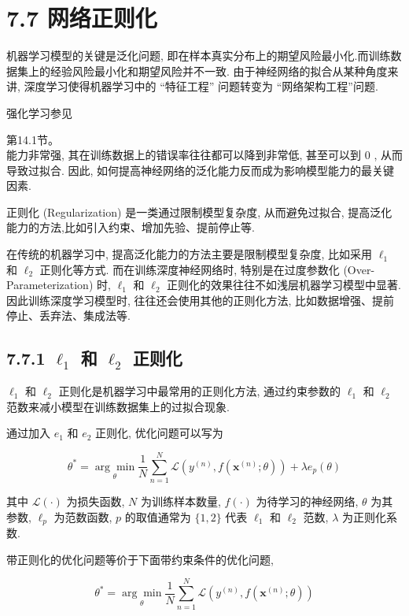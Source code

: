 \documentclass[10pt]{article}
\begin{document}
\section*{7.7 网络正则化}
机器学习模型的关键是泛化问题, 即在样本真实分布上的期望风险最小化.而训练数据集上的经验风险最小化和期望风险并不一致. 由于神经网络的拟合从某种角度来讲, 深度学习使得机器学习中的 “特征工程” 问题转变为 “网络架构工程”问题.

强化学习参见

第14.1节。\\
能力非常强, 其在训练数据上的错误率往往都可以降到非常低, 甚至可以到 0 , 从而导致过拟合. 因此, 如何提高神经网络的泛化能力反而成为影响模型能力的最关键因素.

正则化 (Regularization) 是一类通过限制模型复杂度, 从而避免过拟合, 提高泛化能力的方法,比如引入约束、增加先验、提前停止等.

在传统的机器学习中, 提高泛化能力的方法主要是限制模型复杂度, 比如采用 $\ell_{1}$ 和 $\ell_{2}$ 正则化等方式. 而在训练深度神经网络时, 特别是在过度参数化 (Over-Parameterization) 时, $\ell_{1}$ 和 $\ell_{2}$ 正则化的效果往往不如浅层机器学习模型中显著. 因此训练深度学习模型时, 往往还会使用其他的正则化方法, 比如数据增强、提前停止、丢弃法、集成法等.

\subsection*{7.7.1 $\ell_{1}$ 和 $\ell_{2}$ 正则化}
$\ell_{1}$ 和 $\ell_{2}$ 正则化是机器学习中最常用的正则化方法, 通过约束参数的 $\ell_{1}$ 和 $\ell_{2}$范数来减小模型在训练数据集上的过拟合现象.

通过加入 $e_{1}$ 和 $e_{2}$ 正则化, 优化问题可以写为


\begin{equation*}
\theta^{*}=\underset{\theta}{\arg \min } \frac{1}{N} \sum_{n=1}^{N} \mathcal{L}\left(y^{(n)}, f\left(\boldsymbol{x}^{(n)} ; \theta\right)\right)+\lambda e_{p}(\theta) \tag{7.68}
\end{equation*}


其中 $\mathcal{L}(\cdot)$ 为损失函数, $N$ 为训练样本数量, $f(\cdot)$ 为待学习的神经网络, $\theta$ 为其参数, $\ell_{p}$ 为范数函数, $p$ 的取值通常为 $\{1,2\}$ 代表 $\ell_{1}$ 和 $\ell_{2}$ 范数, $\lambda$ 为正则化系数.

带正则化的优化问题等价于下面带约束条件的优化问题,


\begin{equation*}
\theta^{*}=\underset{\theta}{\arg \min } \frac{1}{N} \sum_{n=1}^{N} \mathcal{L}\left(y^{(n)}, f\left(\boldsymbol{x}^{(n)} ; \theta\right)\right) \tag{7.69}
\end{equation*}
\end{document}
